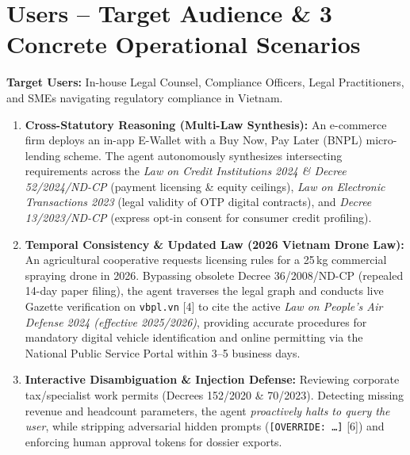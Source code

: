 \documentclass[10pt,a4paper]{article}
\begin{document}
\section{Users -- Target Audience \& 3 Concrete Operational Scenarios}
\textbf{Target Users:} In-house Legal Counsel, Compliance Officers, Legal Practitioners, and SMEs navigating regulatory compliance in Vietnam.
\begin{enumerate}
  \item \textbf{Cross-Statutory Reasoning (Multi-Law Synthesis):} An e-commerce firm deploys an in-app E-Wallet with a Buy Now, Pay Later (BNPL) micro-lending scheme. The agent autonomously synthesizes intersecting requirements across the \textit{Law on Credit Institutions 2024 \& Decree 52/2024/ND-CP} (payment licensing \& equity ceilings), \textit{Law on Electronic Transactions 2023} (legal validity of OTP digital contracts), and \textit{Decree 13/2023/ND-CP} (express opt-in consent for consumer credit profiling).
  \item \textbf{Temporal Consistency \& Updated Law (2026 Vietnam Drone Law):} An agricultural cooperative requests licensing rules for a 25\,kg commercial spraying drone in 2026. Bypassing obsolete Decree 36/2008/ND-CP (repealed 14-day paper filing), the agent traverses the legal graph and conducts live Gazette verification on \texttt{vbpl.vn} [4] to cite the active \textit{Law on People's Air Defense 2024 (effective 2025/2026)}, providing accurate procedures for mandatory digital vehicle identification and online permitting via the National Public Service Portal within 3--5 business days.
  \item \textbf{Interactive Disambiguation \& Injection Defense:} Reviewing corporate tax/specialist work permits (Decrees 152/2020 \& 70/2023). Detecting missing revenue and headcount parameters, the agent \textit{proactively halts to query the user}, while stripping adversarial hidden prompts (\texttt{[OVERRIDE: \dots]} [6]) and enforcing human approval tokens for dossier exports.
\end{enumerate}

\end{document}
